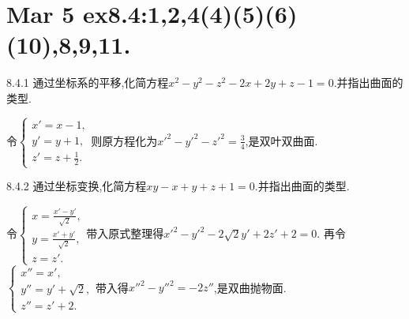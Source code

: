 \section{Mar 5 ex8.4:1,2,4(4)(5)(6)(10),8,9,11.}
\begin{exercise}{8.4.1}
    通过坐标系的平移,化简方程$x^2-y^2-z^2-2x+2y+z-1=0$.并指出曲面的类型.
\end{exercise}
\begin{solution}
    令$\begin{cases}
        x'=x-1,\\
        y'=y+1,\\
        z'=z+\frac{1}{2}.
    \end{cases}$则原方程化为$x'^2-y'^2-z'^2=\frac{3}{4}$,是双叶双曲面.
\end{solution}

\begin{exercise}{8.4.2}
    通过坐标变换,化简方程$xy-x+y+z+1=0$.并指出曲面的类型.
\end{exercise}
\begin{solution}
    令$\begin{cases}
        x=\frac{x'-y'}{\sqrt{2}},\\
        y=\frac{x'+y'}{\sqrt{2}},\\
        z=z'.
    \end{cases}$带入原式整理得$x'^2-y'^2-2\sqrt{2}y'+2z'+2=0$.
    再令$\begin{cases}
        x''=x',\\
        y''=y'+\sqrt{2},\\
        z''=z'+2.
    \end{cases}$带入得$x''^2-y''^2=-2z''$,是双曲抛物面.
\end{solution}

